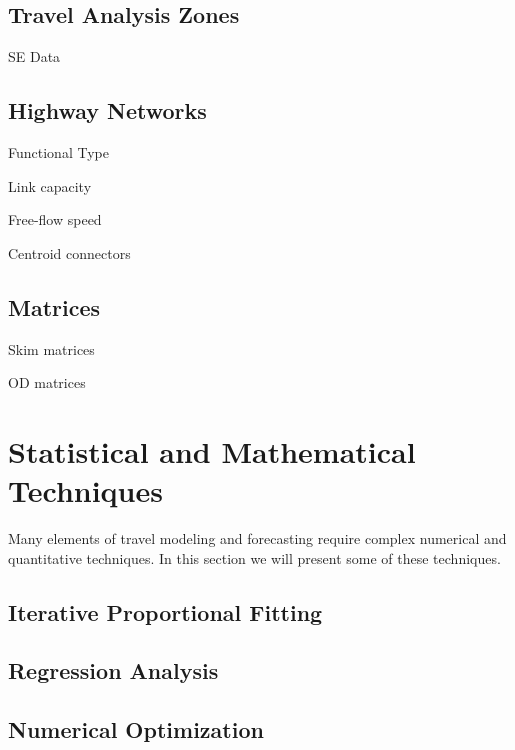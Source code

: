 \documentclass[]{book}
\begin{document}
\hypertarget{travel-analysis-zones}{%
\subsection{Travel Analysis Zones}\label{travel-analysis-zones}}

SE Data

\hypertarget{highway-networks}{%
\subsection{Highway Networks}\label{highway-networks}}

Functional Type

Link capacity

Free-flow speed

Centroid connectors

\hypertarget{matrices}{%
\subsection{Matrices}\label{matrices}}

Skim matrices

OD matrices

\hypertarget{statistical-and-mathematical-techniques}{%
\section{Statistical and Mathematical Techniques}\label{statistical-and-mathematical-techniques}}

Many elements of travel modeling and forecasting require complex numerical and
quantitative techniques. In this section we will present some of these techniques.

\hypertarget{iterative-proportional-fitting}{%
\subsection{Iterative Proportional Fitting}\label{iterative-proportional-fitting}}

\hypertarget{regression-analysis}{%
\subsection{Regression Analysis}\label{regression-analysis}}

\hypertarget{numerical-optimization}{%
\subsection{Numerical Optimization}\label{numerical-optimization}}
\end{document}
